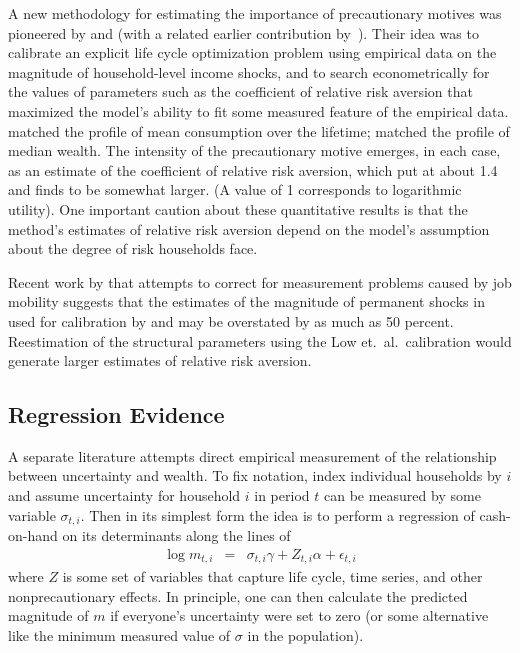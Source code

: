 A new methodology for estimating the importance of precautionary motives was pioneered by
\cite{gpCoverLC} and \cite{cagettiWprofiles} (with a related earlier contribution
by~\cite{palumbo:medical}).  Their idea was to calibrate an explicit life cycle optimization problem using
empirical data on the magnitude of household-level income shocks, and to search econometrically for the values
of parameters such as the coefficient of relative risk aversion that maximized the model's ability to fit some
measured feature of the empirical data.  \cite{gpCoverLC} matched the profile of mean
consumption over the lifetime; \cite{cagettiWprofiles} matched the profile of median wealth.  The intensity of
the precautionary motive emerges, in each case, as an estimate of the coefficient of relative risk aversion,
which \cite{gpCoverLC} put at about 1.4 and \cite{cagettiWprofiles} finds to be somewhat
larger. (A value of 1 corresponds to logarithmic utility).  One important caution about these quantitative
results is that the method's estimates of relative risk aversion depend on the model's assumption about the
degree of risk households face.  
\begin{comment} 
Recent work by \cite{lmp:wagerisk} suggests that the estimates of the magnitude
of permanent shocks in \cite{carroll&samwick:nature} used for calibration by \cite{gpCoverLC}
and \cite{cagettiWprofiles} may be overstated by as much as 50 percent.
\end{comment}
Recent work by \cite{lmp:wagerisk} that attempts to correct for measurement problems caused by 
job mobility suggests that the estimates of the magnitude
of permanent shocks in \cite{carroll&samwick:nature} used for calibration by \cite{gpCoverLC}
and \cite{cagettiWprofiles} may be overstated by as much as 50 percent.
Reestimation of the structural parameters
using the Low et.\ al.\ calibration would generate larger estimates of relative risk aversion.

\subsection{Regression Evidence}

A separate literature attempts direct empirical measurement of the
relationship between uncertainty and wealth.  To fix notation, index
individual households by $i$ and assume uncertainty for household $i$
in period $t$ can be measured by some variable $\sigma_{t,i}$. Then in
its simplest form the idea is to perform a regression of cash-on-hand on 
its determinants along the lines of
\begin{eqnarray}
  \log {m}_{t,i} & = & \sigma_{t,i} \gamma + Z_{t,i} \alpha + \epsilon_{t,i}
\end{eqnarray}
where $Z$ is some set of variables that capture life cycle, time
series, and other nonprecautionary effects.  In principle, one can
then calculate the predicted magnitude of ${m}$ if everyone's
uncertainty were set to zero (or some alternative like the minimum
measured value of $\sigma$ in the population).

